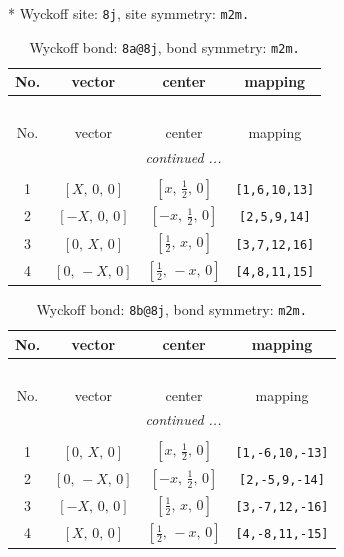 \documentclass[fleqn,8pt]{jsarticle}
\begin{document}
* Wyckoff site: {\tt 8j}, site symmetry: {\tt m2m.}
\renewcommand{\arraystretch}{1.2}
\begin{longtable}{cccc}
\caption{Wyckoff bond: {\tt 8a@8j}, bond symmetry: {\tt m2m.}}
 \\
 \hline \hline
No. & vector & center & mapping \\ \hline \endfirsthead

\multicolumn{3}{l}{\tablename\ \thetable{}} \\
 \hline \hline
No. & vector & center & mapping \\ \hline \endhead

 \hline \hline
\multicolumn{3}{r}{\footnotesize\it continued ...} \\ \endfoot

 \hline \hline
\multicolumn{3}{r}{} \\ \endlastfoot

1 & $\left[ X,\, 0,\, 0 \right]$ & $\left[ x,\, \frac{1}{2},\, 0 \right]$ & {\tt [1,6,10,13]} \\ \hline
2 & $\left[ - X,\, 0,\, 0 \right]$ & $\left[ - x,\, \frac{1}{2},\, 0 \right]$ & {\tt [2,5,9,14]} \\ \hline
3 & $\left[ 0,\, X,\, 0 \right]$ & $\left[ \frac{1}{2},\, x,\, 0 \right]$ & {\tt [3,7,12,16]} \\ \hline
4 & $\left[ 0,\, - X,\, 0 \right]$ & $\left[ \frac{1}{2},\, - x,\, 0 \right]$ & {\tt [4,8,11,15]} \\
\end{longtable}
\renewcommand{\arraystretch}{1.2}
\begin{longtable}{cccc}
\caption{Wyckoff bond: {\tt 8b@8j}, bond symmetry: {\tt m2m.}}
 \\
 \hline \hline
No. & vector & center & mapping \\ \hline \endfirsthead

\multicolumn{3}{l}{\tablename\ \thetable{}} \\
 \hline \hline
No. & vector & center & mapping \\ \hline \endhead

 \hline \hline
\multicolumn{3}{r}{\footnotesize\it continued ...} \\ \endfoot

 \hline \hline
\multicolumn{3}{r}{} \\ \endlastfoot

1 & $\left[ 0,\, X,\, 0 \right]$ & $\left[ x,\, \frac{1}{2},\, 0 \right]$ & {\tt [1,-6,10,-13]} \\ \hline
2 & $\left[ 0,\, - X,\, 0 \right]$ & $\left[ - x,\, \frac{1}{2},\, 0 \right]$ & {\tt [2,-5,9,-14]} \\ \hline
3 & $\left[ - X,\, 0,\, 0 \right]$ & $\left[ \frac{1}{2},\, x,\, 0 \right]$ & {\tt [3,-7,12,-16]} \\ \hline
4 & $\left[ X,\, 0,\, 0 \right]$ & $\left[ \frac{1}{2},\, - x,\, 0 \right]$ & {\tt [4,-8,11,-15]} \\
\end{longtable}
\end{document}
